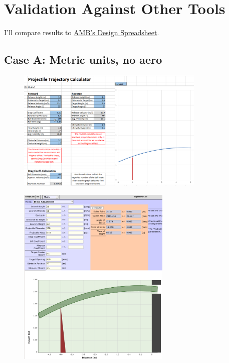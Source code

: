 \documentclass[10pt,letterpaper]{article}
\begin{document}
\section{Validation Against Other Tools}

	I'll compare results to \href{https://www.chiefdelphi.com/t/amb-design-spreadsheet-v5/383857}{\underline{AMB's Design Spreadsheet}}.

	\newpage
	\subsection*{Case A: Metric units, no aero}

	\begin{figure}[H]
		\includegraphics[width=0.8\textwidth]{validation/trajectory_AMB_A.png}
	\end{figure}

	\begin{figure}[H]
		\includegraphics[width=0.65\textwidth]{validation/trajectory_EC_A.png}
	\end{figure}
\end{document}
